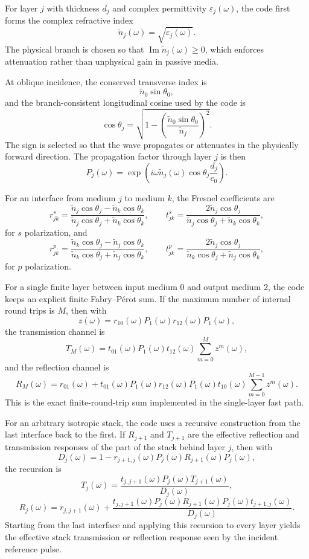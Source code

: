 \documentclass[11pt]{article}
\begin{document}
For layer $j$ with thickness $d_j$ and complex permittivity $\varepsilon_j(\omega)$, the code first forms the complex refractive index
\[
\tilde{n}_j(\omega)=\sqrt{\varepsilon_j(\omega)}.
\]
The physical branch is chosen so that $\operatorname{Im}\tilde{n}_j(\omega)\ge 0$, which enforces attenuation rather than unphysical gain in passive media.

At oblique incidence, the conserved transverse index is
\[
\tilde{n}_0\sin\theta_0,
\]
and the branch-consistent longitudinal cosine used by the code is
\[
\cos\theta_j=\sqrt{1-\left(\frac{\tilde{n}_0\sin\theta_0}{\tilde{n}_j}\right)^2}.
\]
The sign is selected so that the wave propagates or attenuates in the physically forward direction. The propagation factor through layer $j$ is then
\[
P_j(\omega)=\exp\!\left(i\omega \tilde{n}_j(\omega)\cos\theta_j\frac{d_j}{c_0}\right).
\]

For an interface from medium $j$ to medium $k$, the Fresnel coefficients are
\[
r_{jk}^s=\frac{\tilde{n}_j\cos\theta_j-\tilde{n}_k\cos\theta_k}{\tilde{n}_j\cos\theta_j+\tilde{n}_k\cos\theta_k}, \qquad
t_{jk}^s=\frac{2\tilde{n}_j\cos\theta_j}{\tilde{n}_j\cos\theta_j+\tilde{n}_k\cos\theta_k},
\]
for $s$ polarization, and
\[
r_{jk}^p=\frac{\tilde{n}_k\cos\theta_j-\tilde{n}_j\cos\theta_k}{\tilde{n}_k\cos\theta_j+\tilde{n}_j\cos\theta_k}, \qquad
t_{jk}^p=\frac{2\tilde{n}_j\cos\theta_j}{\tilde{n}_k\cos\theta_j+\tilde{n}_j\cos\theta_k},
\]
for $p$ polarization.

For a single finite layer between input medium $0$ and output medium $2$, the code keeps an explicit finite Fabry--Pérot sum. If the maximum number of internal round trips is $M$, then with
\[
z(\omega)=r_{10}(\omega)P_1(\omega)r_{12}(\omega)P_1(\omega),
\]
the transmission channel is
\[
T_M(\omega)=t_{01}(\omega)P_1(\omega)t_{12}(\omega)\sum_{m=0}^M z^m(\omega),
\]
and the reflection channel is
\[
R_M(\omega)=r_{01}(\omega)+t_{01}(\omega)P_1(\omega)r_{12}(\omega)P_1(\omega)t_{10}(\omega)\sum_{m=0}^{M-1} z^m(\omega).
\]
This is the exact finite-round-trip sum implemented in the single-layer fast path.

For an arbitrary isotropic stack, the code uses a recursive construction from the last interface back to the first. If $R_{j+1}$ and $T_{j+1}$ are the effective reflection and transmission responses of the part of the stack behind layer $j$, then with
\[
D_j(\omega)=1-r_{j+1,j}(\omega)P_j(\omega)R_{j+1}(\omega)P_j(\omega),
\]
the recursion is
\[
T_j(\omega)=\frac{t_{j,j+1}(\omega)P_j(\omega)T_{j+1}(\omega)}{D_j(\omega)},
\]
\[
R_j(\omega)=r_{j,j+1}(\omega)+\frac{t_{j,j+1}(\omega)P_j(\omega)R_{j+1}(\omega)P_j(\omega)t_{j+1,j}(\omega)}{D_j(\omega)}.
\]
Starting from the last interface and applying this recursion to every layer yields the effective stack transmission or reflection response seen by the incident reference pulse.
\end{document}
